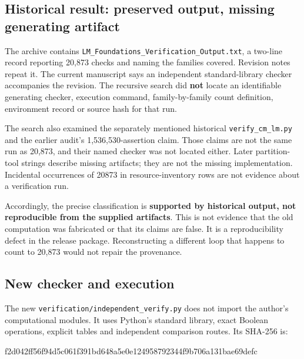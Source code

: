 \documentclass[
  10pt,
]{article}
\newenvironment{Shaded}{}{}
\newcommand{\NormalTok}[1]{#1}
\begin{document}
\subsection{Historical result: preserved output, missing generating
artifact}\label{historical-result-preserved-output-missing-generating-artifact}

The archive contains \texttt{LM\_Foundations\_Verification\_Output.txt},
a two-line record reporting 20,873 checks and naming the families
covered. Revision notes repeat it. The current manuscript says an
independent standard-library checker accompanies the revision. The
recursive search did \textbf{not} locate an identifiable generating
checker, execution command, family-by-family count definition,
environment record or source hash for that run.

The search also examined the separately mentioned historical
\texttt{verify\_cm\_lm.py} and the earlier audit's 1,536,530-assertion
claim. Those claims are not the same run as 20,873, and their named
checker was not located either. Later partition-tool strings describe
missing artifacts; they are not the missing implementation. Incidental
occurrences of 20873 in resource-inventory rows are not evidence about a
verification run.

Accordingly, the precise classification is \textbf{supported by
historical output, not reproducible from the supplied artifacts}. This
is not evidence that the old computation was fabricated or that its
claims are false. It is a reproducibility defect in the release package.
Reconstructing a different loop that happens to count to 20,873 would
not repair the provenance.

\subsection{New checker and execution}\label{new-checker-and-execution}

The new \texttt{verification/independent\_verify.py} does not import the
author's computational modules. It uses Python's standard library, exact
Boolean operations, explicit tables and independent comparison routes.
Its SHA-256 is:

\begin{Shaded}
\begin{Highlighting}[]
\NormalTok{f2d042ff56f94d5c061f391bd648a5e0e124958792344f9b706a131bae69defc}
\end{Highlighting}
\end{Shaded}
\end{document}
